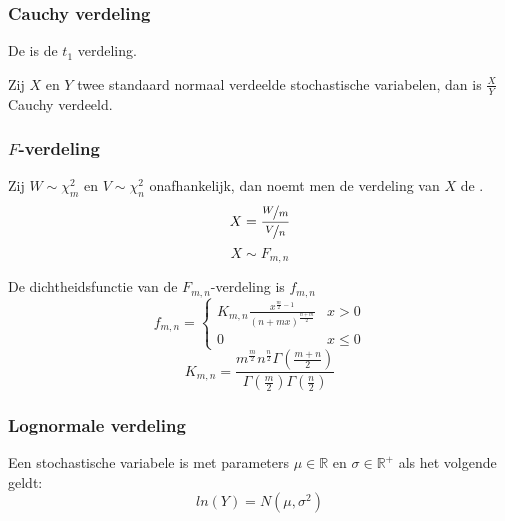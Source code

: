 \documentclass[main.tex]{subfiles}
\begin{document}
\subsubsection{Cauchy verdeling}
\label{sec:cauchy-verdeling}

\begin{de}
  De  is de $t_{1}$ verdeling.
\end{de}

\begin{ei}
  Zij $X$ en $Y$ twee standaard normaal verdeelde stochastische variabelen, dan is $\frac{X}{Y}$ Cauchy verdeeld.
\end{ei}


\subsubsection{$F$-verdeling}
\label{sec:f-verdeling}

\begin{de}
  Zij $ W\sim \chi_{m}^{2}$ en $V \sim \chi_{n}^{2}$ onafhankelijk, dan noemt men de verdeling van $X$ de .
  \[ X = \frac{\nicefrac{W}{m}}{\nicefrac{V}{n}} \]
  \[ X \sim F_{m,n} \]
\end{de}

\begin{st}
  De dichtheidsfunctie van de $F_{m,n}$-verdeling is $f_{m,n}$
  \[
  f_{m,n} = 
  \left\{
    \begin{array}{ll}
      K_{m,n}\frac{x^{\frac{m}{2}-1}}{(n+mx)^{\frac{n+m}{2}}} & x > 0\\
      0 & x \le 0
    \end{array}
  \right.
  \]
  \[
  K_{m,n} = \frac{m^{\frac{m}{2}}n^{\frac{n}{2}}\Gamma\left(\frac{m+n}{2}\right)}{\Gamma\left(\frac{m}{2}\right)\Gamma\left(\frac{n}{2}\right)}
  \]
\end{st}

\subsubsection{Lognormale verdeling}
\label{sec:lognormale-verdeling}

\begin{de}
  Een stochastische variabele is  met parameters $\mu \in\mathbb{R}$ en $\sigma \in \mathbb{R}^{+}$ als het volgende geldt:
  \[ ln(Y) = N(\mu,\sigma^{2})\]
\end{de}
\end{document}
